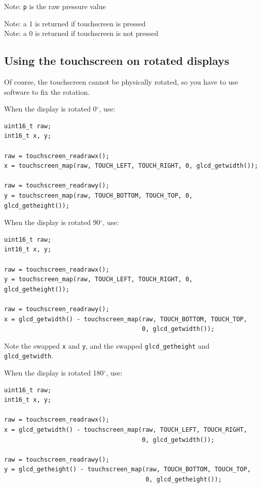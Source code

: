 \documentclass[12pt]{article}
\begin{document}
Note: \lstinline|p| is the raw pressure value

Note: a 1 is returned if touchscreen is pressed\\
Note: a 0 is returned if touchscreen is not pressed\\

\subsection{Using the touchscreen on rotated displays}
\label{sec:rottouch}
Of course, the touchscreen cannot be physically rotated, so you have to use software to fix the rotation.

When the display is rotated 0$^\circ$, use:

\begin{lstlisting}
uint16_t raw;
int16_t x, y;

raw = touchscreen_readrawx();
x = touchscreen_map(raw, TOUCH_LEFT, TOUCH_RIGHT, 0, glcd_getwidth());

raw = touchscreen_readrawy();
y = touchscreen_map(raw, TOUCH_BOTTOM, TOUCH_TOP, 0, glcd_getheight());
\end{lstlisting}

When the display is rotated 90$^\circ$, use:

\begin{lstlisting}
uint16_t raw;
int16_t x, y;

raw = touchscreen_readrawx();
y = touchscreen_map(raw, TOUCH_LEFT, TOUCH_RIGHT, 0, glcd_getheight());

raw = touchscreen_readrawy();
x = glcd_getwidth() - touchscreen_map(raw, TOUCH_BOTTOM, TOUCH_TOP,
                                      0, glcd_getwidth());
\end{lstlisting}

Note the swapped \lstinline|x| and \lstinline|y|, and the swapped \lstinline|glcd_getheight| and \lstinline|glcd_getwidth|.

When the display is rotated 180$^\circ$, use:

\begin{lstlisting}
uint16_t raw;
int16_t x, y;

raw = touchscreen_readrawx();
x = glcd_getwidth() - touchscreen_map(raw, TOUCH_LEFT, TOUCH_RIGHT,
                                      0, glcd_getwidth());

raw = touchscreen_readrawy();
y = glcd_getheight() - touchscreen_map(raw, TOUCH_BOTTOM, TOUCH_TOP,
                                       0, glcd_getheight());
\end{lstlisting}
\end{document}
